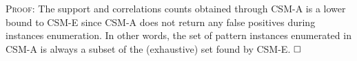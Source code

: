 \textsc{Proof:} The support and correlations counts obtained through CSM-A is a lower bound to CSM-E %
since {\sf CSM-A} does not return any false positives during instances enumeration. In other words, the set
of pattern instances enumerated in {\sf CSM-A} is always a subset of the
(exhaustive) set found by {\sf CSM-E}. $\hfill\square$ %

